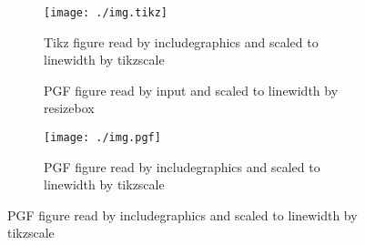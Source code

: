 \documentclass{article}
\begin{document}
\begin{figure}
    \begin{subfigure}[t]{0.3\textwidth}
        \texttt{[image: ./img.tikz]}
        \caption{Tikz figure read by includegraphics and scaled to linewidth by tikzscale}
    \end{subfigure}
\hfill
    \begin{subfigure}[t]{0.3\textwidth}
        \resizebox{\linewidth}{!}{}       %
        \caption{PGF figure read by input and scaled to linewidth by resizebox}
    \end{subfigure}
\hfill
    \begin{subfigure}[t]{0.3\textwidth}
        \texttt{[image: ./img.pgf]} %
        \caption{PGF figure read by includegraphics and scaled to linewidth by tikzscale}
\end{subfigure}    
\end{figure}
\end{document}
